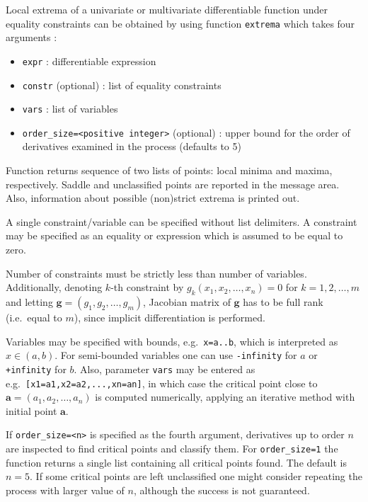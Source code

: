 \documentclass[a4paper,11pt]{book}
\begin{document}
Local extrema of a univariate or multivariate differentiable function under equality constraints can be obtained by using function {\tt extrema} which takes four arguments :
\begin{itemize}
\item {\tt expr} : differentiable expression
\item {\tt constr} (optional) : list of equality constraints
\item {\tt vars} : list of variables
\item {\tt order\_size=<positive integer>} (optional) : upper bound for the order of derivatives examined in the process (defaults to 5)
\end{itemize}
Function returns sequence of two lists of points: local minima and maxima, respectively. Saddle and unclassified points are reported in the message area. Also, information about possible (non)strict extrema is printed out.

A single constraint/variable can be specified without list delimiters. A constraint may be specified as an equality or expression which is assumed to be equal to zero.

Number of constraints must be strictly less than number of variables. Additionally, denoting $ k $-th constraint by $ g_k(x_1,x_2,\dots,x_n)=0 $ for $ k=1,2,\dots,m $ and letting $ \mathbf{g}=(g_1,g_2,\dots,g_m) $, Jacobian matrix of $ \mathbf{g} $ has to be full rank (i.e.~equal to $ m $), since implicit differentiation is performed.

Variables may be specified with bounds, e.g.~{\tt x=a..b}, which is interpreted as $ x\in(a,b) $. For semi-bounded variables one can use {\tt -infinity} for $ a $ or {\tt +infinity} for $ b $. Also, parameter {\tt vars} may be entered as e.g.~{\tt [x1=a1,x2=a2,...,xn=an]}, in which case the critical point close to $ \mathbf{a}=(a_1,a_2,\dots,a_n) $ is computed numerically, applying an iterative method with initial point $ \mathbf{a} $.

If {\tt order\_size=<n>} is specified as the fourth argument, derivatives up to order $ n $ are inspected to find critical points and classify them. For {\tt order\_size=1} the function returns a single list containing all critical points found. The default is $ n=5 $. If some critical points are left unclassified one might consider repeating the process with larger value of $ n $, although the success is not guaranteed.
\end{document}
